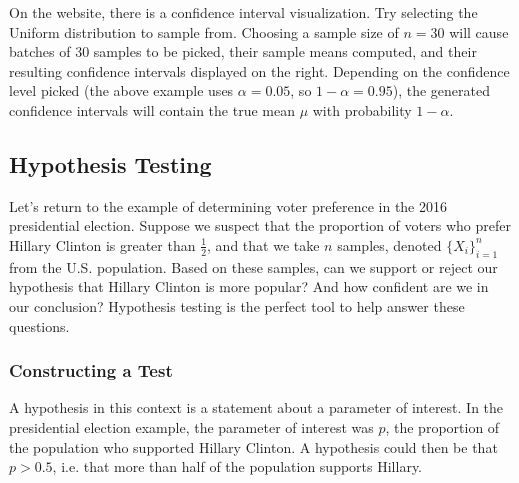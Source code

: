 \documentclass[11pt,letterpaper]{article}
\numberwithin{theorem}{section}
\numberwithin{definition}{section}
\numberwithin{lemma}{section}
\numberwithin{corollary}{section}
\numberwithin{proposition}{section}
\theoremstyle{definition}
\numberwithin{remark}{section}
\numberwithin{claim}{section}
\numberwithin{observation}{section}
\numberwithin{fact}{section}
\numberwithin{assumption}{section}
\numberwithin{example}{section}
\numberwithin{exercise}{section}
\begin{document}
On the website, there is a confidence interval visualization. Try selecting the Uniform distribution to sample from. Choosing a sample size of $n = 30$ will cause batches of 30 samples to be picked, their sample means computed, and their resulting confidence intervals displayed on the right. Depending on the confidence level picked (the above example uses $\alpha = 0.05$, so $1-\alpha = 0.95$), the generated confidence intervals will contain the true mean $\mu$ with probability $1-\alpha$.

\newpage

\subsection{Hypothesis Testing}
Let's return to the example of determining voter preference in the 2016 presidential election. Suppose we suspect that the proportion of voters who prefer Hillary Clinton is greater than $\frac{1}{2}$, and that we take $n$ samples, denoted $\{X_i\}_{i=1}^n$ from the U.S. population. Based on these samples, can we support or reject our hypothesis that Hillary Clinton is more popular? And how confident are we in our conclusion? Hypothesis testing is the perfect tool to help answer these questions.

\subsubsection{Constructing a Test}
A hypothesis in this context is a statement about a parameter of interest. In the presidential election example, the parameter of interest was $p$, the proportion of the population who supported Hillary Clinton. A hypothesis could then be that $p > 0.5$, i.e. that more than half of the population supports Hillary.
\end{document}
